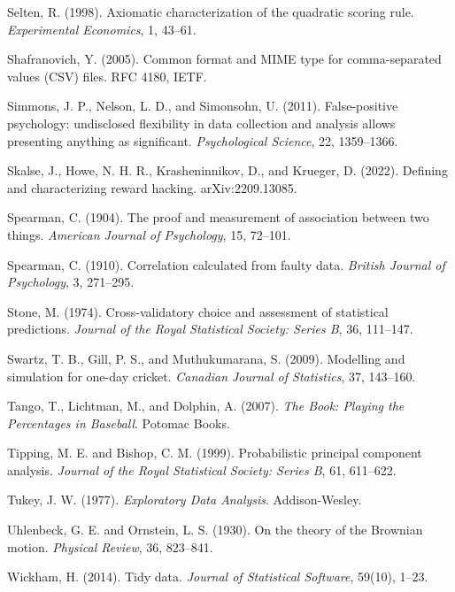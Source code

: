 \documentclass[11pt,letterpaper]{article}
\begin{document}
\begin{footnotesize}
\begin{enumerate}[leftmargin=1.6em, itemsep=1pt, label={[\arabic*]}]
\item Selten, R. (1998). Axiomatic characterization of the quadratic scoring rule. \emph{Experimental Economics}, 1, 43--61.
\item Shafranovich, Y. (2005). Common format and MIME type for comma-separated values (CSV) files. RFC 4180, IETF.
\item Simmons, J. P., Nelson, L. D., and Simonsohn, U. (2011). False-positive psychology: undisclosed flexibility in data collection and analysis allows presenting anything as significant. \emph{Psychological Science}, 22, 1359--1366.
\item Skalse, J., Howe, N. H. R., Krasheninnikov, D., and Krueger, D. (2022). Defining and characterizing reward hacking. arXiv:2209.13085.
\item Spearman, C. (1904). The proof and measurement of association between two things. \emph{American Journal of Psychology}, 15, 72--101.
\item Spearman, C. (1910). Correlation calculated from faulty data. \emph{British Journal of Psychology}, 3, 271--295.
\item Stone, M. (1974). Cross-validatory choice and assessment of statistical predictions. \emph{Journal of the Royal Statistical Society: Series B}, 36, 111--147.
\item Swartz, T. B., Gill, P. S., and Muthukumarana, S. (2009). Modelling and simulation for one-day cricket. \emph{Canadian Journal of Statistics}, 37, 143--160.
\item Tango, T., Lichtman, M., and Dolphin, A. (2007). \emph{The Book: Playing the Percentages in Baseball}. Potomac Books.
\item Tipping, M. E. and Bishop, C. M. (1999). Probabilistic principal component analysis. \emph{Journal of the Royal Statistical Society: Series B}, 61, 611--622.
\item Tukey, J. W. (1977). \emph{Exploratory Data Analysis}. Addison-Wesley.
\item Uhlenbeck, G. E. and Ornstein, L. S. (1930). On the theory of the Brownian motion. \emph{Physical Review}, 36, 823--841.
\item Wickham, H. (2014). Tidy data. \emph{Journal of Statistical Software}, 59(10), 1--23.
\end{enumerate}
\end{footnotesize}
\end{document}
